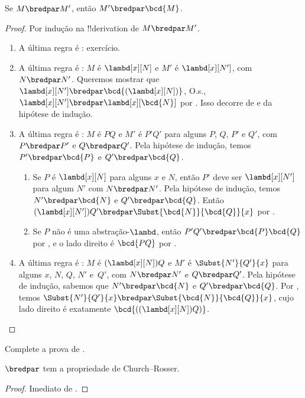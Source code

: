 \documentclass[../../../include/open-logic-section]{subfiles}
\begin{document}
\begin{lem}
  Se $M \bredpar M'$, então $M' \bredpar \bcd{M}$.
\end{lem}
\begin{proof}
  Por indução na !!{derivation} de $M \bredpar M'$.
  \begin{enumerate}
    \item A última regra é : exercício.
    \item A última regra é : $M$ é
      $\lambd[x][N]$ e $M'$ é $\lambd[x][N']$, com
      $N \bredpar N'$. Queremos mostrar que $\lambd[x][N'] \bredpar
      \bcd{(\lambd[x][N])}$, O.s.\@, $\lambd[x][N'] \bredpar
      \lambd[x][\bcd{N}]$ por . Isso decorre de
       e da hipótese de indução.
    \item A última regra é : $M$ é $PQ$ e $M'$ é
      $P'Q'$ para alguns $P$, $Q$, $P'$ e $Q'$, com $P \bredpar P'$ e
      $Q \bredpar Q'$. Pela hipótese de indução, temos $P' \bredpar \bcd{P}$
      e $Q' \bredpar \bcd{Q}$.
      \begin{enumerate}
        \item Se $P$ é $\lambd[x][N]$ para alguns $x$ e $N$, então $P'$ deve
          ser $\lambd[x][N']$ para algum $N'$ com $N \bredpar N'$. Pela
          hipótese de indução, temos $N' \bredpar \bcd{N}$ e
          $Q' \bredpar \bcd{Q}$. Então $(\lambd[x][N'])Q' \bredpar
          \Subst{\bcd{N}}{\bcd{Q}}{x}$ por .
        \item Se $P$ não é uma abstração-$\lambd$, então
          $P'Q' \bredpar \bcd{P}\bcd{Q}$ por , e o
          lado direito é $\bcd{PQ}$ por .
      \end{enumerate}
    \item A última regra é : $M$ é
      $(\lambd[x][N])Q$ e $M'$ é $\Subst{N'}{Q'}{x}$ para alguns $x$,
      $N$, $Q$, $N'$ e~$Q'$, com $N \bredpar N'$ e $Q \bredpar Q'$. Pela
      hipótese de indução, sabemos que $N' \bredpar \bcd{N}$ e
      $Q' \bredpar \bcd{Q}$. Por , temos
      $\Subst{N'}{Q'}{x} \bredpar \Subst{\bcd{N}}{\bcd{Q}}{x}$, cujo lado
      direito é exatamente $\bcd{((\lambd[x][N])Q)}$.
  \end{enumerate}
\end{proof}

\begin{prob}
  Complete a prova de .
\end{prob}

\begin{thm}
  $\bredpar$ tem a propriedade de Church--Rosser.
\end{thm}

\begin{proof}
  Imediato de .
\end{proof}
\end{document}
